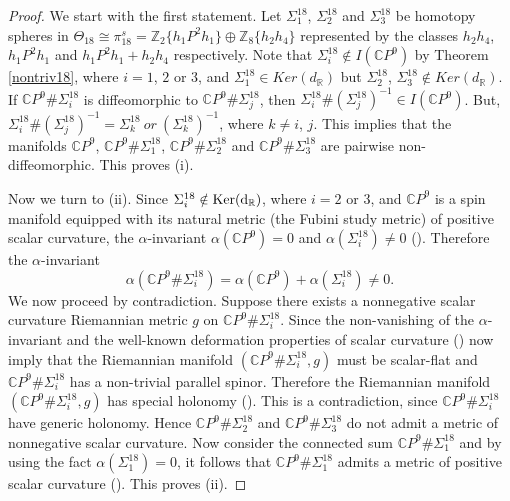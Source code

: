 \documentclass[a4paper,leqno,12pt]{amsart}
\theoremstyle{plain}
\theoremstyle{definition}
\numberwithin{equation}{section}
\begin{document}
\begin{proof}
We start with the first statement. Let $\Sigma^{18}_{1}$, $\Sigma^{18}_2$ and $\Sigma^{18}_3$ be homotopy spheres in $\Theta_{18}\cong \pi_{18}^s={\mathbb{Z}}_2\{h_1P^2h_1\} \oplus {\mathbb{Z}}_8\{h_2h_4\}$ represented by the classes $h_2h_4$, $h_1P^2h_1$ and $h_1P^2h_1+h_2h_4$ respectively. Note that $\Sigma^{18}_{i}\notin I(\mathbb{C} P^{9})$ by Theorem \ref{nontriv18}, where $i=1$, $2$ or $3$, and $\Sigma^{18}_1\in {\mathit{Ker}}(d_{\mathbb{R}})$ but $\Sigma^{18}_2$, $\Sigma^{18}_3\notin {\mathit{Ker}}(d_{\mathbb{R}})$. If $\mathbb{C} P^{9}\#\Sigma^{18}_{i}$ is diffeomorphic to $\mathbb{C} P^{9}\#\Sigma^{18}_{j}$, then $\Sigma^{18}_{i}\#(\Sigma^{18}_{j})^{-1}\in I(\mathbb{C}P^{9})$. But, $\Sigma^{18}_{i}\#(\Sigma^{18}_{j})^{-1}=\Sigma^{18}_{k}~ or~ (\Sigma^{18}_{k})^{-1}$, where $k\neq i$, $j$. This implies that the manifolds $\mathbb{C} P^{9}$, $\mathbb{C} P^{9}\#\Sigma^{18}_{1}$, $\mathbb{C} P^{9}\#\Sigma^{18}_{2}$ and $\mathbb{C} P^{9}\#\Sigma^{18}_{3}$ are pairwise non-diffeomorphic. This proves (i).

Now we turn to (ii). Since $\Sigma^{18}_i\notin \rm{Ker}(d_{\mathbb{R}})$, where $i=2$ or $3$, and $\mathbb{C}P^{9}$ is a spin manifold equipped with its natural metric (the
Fubini study metric) of positive scalar curvature, the $\alpha$-invariant $\alpha(\mathbb{C}P^{9})=0$ and $\alpha(\Sigma^{18}_i)\neq 0$ (\cite{Hit74}).
 Therefore the $\alpha$-invariant $$\alpha(\mathbb{C}P^{9}\#\Sigma^{18}_i)=\alpha(\mathbb{C}P^{9})+\alpha(\Sigma^{18}_i)\neq 0.$$
 We now proceed by contradiction. Suppose there exists a nonnegative scalar curvature Riemannian metric $g$ on $\mathbb{C}P^{9}\#\Sigma^{18}_i$. Since the non-vanishing of the $\alpha$-invariant and the well-known deformation properties of scalar curvature (\cite{KW75}) now imply that the Riemannian manifold $(\mathbb{C}P^{9}\#\Sigma^{18}_i, g)$ must be scalar-flat and $\mathbb{C}P^{9}\#\Sigma^{18}_i$ has a non-trivial parallel spinor. Therefore the Riemannian manifold $(\mathbb{C}P^{9}\#\Sigma^{18}_i, g)$ has special holonomy (\cite{Hit74}). This is a contradiction, since $\mathbb{C}P^{9}\#\Sigma^{18}_i$ have generic holonomy. Hence $\mathbb{C}P^{9}\#\Sigma^{18}_2$ and $\mathbb{C}P^{9}\#\Sigma^{18}_3$ do not admit a metric of nonnegative scalar curvature. Now consider the connected sum $\mathbb{C}P^{9}\#\Sigma^{18}_1$ and by using the fact $\alpha(\Sigma^{18}_1)=0$, it follows that $\mathbb{C}P^{9}\#\Sigma^{18}_1$ admits a metric of positive scalar curvature (\cite{GL80}). This proves (ii).
\end{proof}
\end{document}
